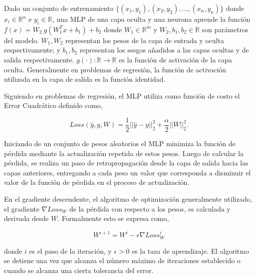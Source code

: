 \documentclass[spanish]{article}
\begin{document}
          Dado un conjunto de entrenamiento $\{(x_1, y_1), (x_2, y_2), \ldots, (x_n, y_n)\}$ donde 
          $x_i \in \mathbb{R}^n$ e $y_i \in \mathbb{R}$, una MLP de una capa oculta y una neurona 
          aprende la función $f(x) = W_2 ~ g(W_1^T x + b_1) + b_2$ donde $W_1 \in \mathbb{R}^m$ y 
          $W_2, b_1, b_2 \in \mathbb{R}$ son parámetros del modelo. $W_1, W_2$ representan los 
          pesos de la capa de entrada y oculta respectivamente; y $b_1, b_2$ representan los sesgos 
          añadidos a las capas ocultas y de salida respectivamente. $g(\cdot): \mathbb{R} \rightarrow \mathbb{R}$ 
          es la función de activación de la capa oculta. Generalmente en problemas de regresión, 
          la función de activación utilizada en la capa de salida es la función identidad. \medskip
            
          Siguiendo en problemas de regresión, el MLP utiliza como función de costo el Error Cuadrático 
          definido como,
          
          \begin{equation}
            Loss(\hat{y},y,W) = \frac{1}{2}||\hat{y} - y ||_2^2 + \frac{\alpha}{2} ||W||_2^2.
          \end{equation}

          Iniciando de un conjunto de pesos aleatorios el MLP minimiza la función de pérdida mediante 
          la actualización repetida de estos pesos. Luego de calcular la pérdida, se realiza un paso de 
          retropropagación desde la capa de salida hacia las capas anteriores, entregando a cada peso un 
          valor que corresponda a disminuir el valor de la función de pérdida en el proceso de actualización. \medskip

          En el gradiente descendente, el algoritmo de optimización generalmente utilizado, el gradiente 
          $\nabla Loss_{W}$  de la pérdida con respecto a los pesos, es calculada y derivada desde $W$. 
          Formalmente esto se expresa como,

          \begin{equation}
            W^{i+1} = W^i - \epsilon \nabla {Loss}_{W}^{i}
          \end{equation}
              
          donde $i$ es el paso de la iteración, y $\epsilon > 0$ es la taza de aprendizaje. El algoritmo 
          se detiene una vez que alcanza el número máximo de iteraciones establecido o cuando se alcanza 
          una cierta tolerancia del error. \medskip
          
\end{document}
